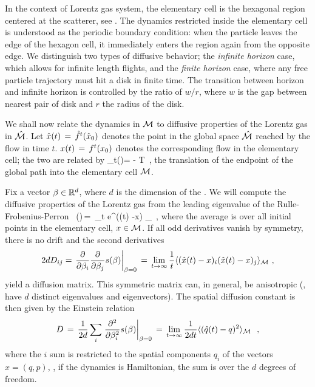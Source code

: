 \documentclass[aps,pre,
                showpacs,
                twocolumn,
                groupedaddress,
                floatfix]{revtex4-1}
\begin{document}
In the context of Lorentz gas system, the elementary cell is the
hexagonal region centered at the scatterer, see
. The dynamics restricted inside the elementary
cell is understood as the periodic boundary condition: when the particle
leaves the edge of the hexagon cell, it immediately enters the region
again from the opposite edge. We distinguish two types of diffusive
behavior; the {\em infinite horizon} case, which allows for infinite
length flights, and the {\em finite horizon} case, where any free
particle trajectory must hit a disk in finite time. The transition
between horizon and infinite horizon is controlled by the ratio of
$w/r$, where $w$ is the gap between nearest pair of disk and $r$ the
radius of the disk.

We shall now relate the dynamics in ${\cal M}$ to diffusive properties of
the Lorentz gas in $\hat {{\cal M}}$. Let $\hat x(t)\,=\,{\hat{f}^{t}(\hat x_0)}$ denotes the
point in the global space $\hat {{\cal M}}$ reached by the flow in time
$t$. $x(t)\,=\,{f^{t}({x_0})}$ denotes the corresponding flow in the
elementary cell; the two are related by
 \beq \hn_t(\xInit)=
 -  \in T \,, 
the translation of the endpoint of the global path into the elementary
cell $\pS$.

Fix a vector $\beta \in \reals^d$, where $d$ is the dimension of the
{\statesp}. We will compute the diffusive properties of the Lorentz
gas from the leading eigenvalue of the Rulle-Frobenius-Perron \evOper\
\beq \eigenvL(\beta)\,=\, \lim_{t \rightarrow \infty}  \log
\langle e^{\beta \cdot (\hx(t) -x) } \rangle_\pS ~, \quad
{}
where the average is over all initial points in the elementary cell,
$x \in \pS$. If all odd derivatives vanish by symmetry, there is no drift and the second derivatives
\[
2d D_{ij} = \left . {\frac{\partial}{\partial \beta_i}}
  {\frac{\partial} {\partial \beta_j}} \eigenvL(\beta)\right
|_{\beta=0} \,=\,\lim_{t\rightarrow \infty} {\frac{1}{t}} \langle
{(\hx(t) -x)_i (\hx(t) -x)_j } \rangle_\pS ~,
\]
yield a diffusion matrix.  This symmetric matrix can, in general, be
anisotropic (\ie, have $d$ distinct eigenvalues and
eigen\-vectors). The spatial diffusion constant is then given by the
Einstein relation
\[
D\,=\,{1\over 2 d} \sum_i \left .{{\partial}^2 \over {\partial
      \beta^2_i}} s(\beta)\right |_{\beta=0} \,=\,
\lim_{t\rightarrow \infty} {1\over{2d t}} \langle {(\hat{q}(t) -q)^2 }
\rangle_{{\cal M}}~ ~,
\]
where the $i$ sum is restricted to the spatial components $q_i$ of the
{\statesp} vectors $x=(q,p)$, \ie, if the dynamics is Hamiltonian, the
sum is over the $d$ degrees of freedom.
\end{document}

